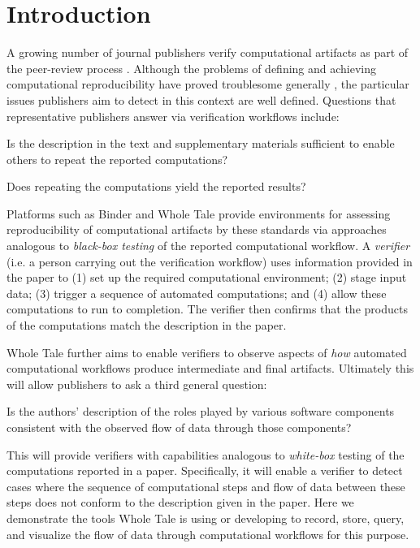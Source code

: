\vspace*{-2em}

\section{Introduction}

A growing number of journal publishers verify computational artifacts as part of the peer-review process \cite{Willis2020Trust}. Although the problems of defining and achieving computational reproducibility have proved troublesome generally \cite{reproducibilitynas}, the particular issues publishers aim to detect in this context are well defined. Questions that representative publishers answer via verification workflows include:

\begin{itemize}

\tinyitem Is the description in the text and supplementary materials sufficient to enable others to repeat the reported computations?

\tinyitem Does repeating the computations yield the reported results?

\end{itemize}

Platforms such as Binder \cite{Binder_2018} and Whole Tale  \cite{brinckman2019computing} provide environments for assessing reproducibility of computational artifacts by these standards via approaches analogous to \emph{black-box testing} of the reported computational workflow. A \emph{verifier} (i.e. a person carrying out the verification workflow) uses information provided in the paper to (1) set up the required computational environment; (2) stage input data; (3) trigger a sequence of automated computations; and (4) allow these computations to run to completion. The verifier then confirms that the products of the computations match the description in the paper.

Whole Tale further aims to enable verifiers to observe aspects of \emph{how} automated computational workflows produce intermediate and final artifacts. Ultimately this will allow publishers to ask a third general question:

\begin{itemize}

\tinyitem Is the authors' description of the roles played by various software components consistent with the observed flow of data through those components?

\end{itemize}

This will provide verifiers with capabilities analogous to \emph{white-box} testing of the computations reported in a paper. Specifically, it will enable a verifier to detect cases where the sequence of computational steps and flow of data between these steps does not conform to the description given in the paper. Here we demonstrate the tools Whole Tale is using or developing to record, store, query, and visualize the flow of data through computational workflows for this purpose.








